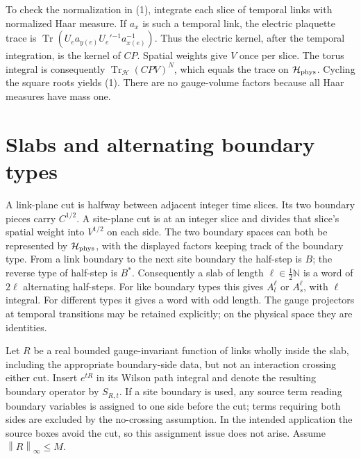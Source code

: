 \documentclass[11pt]{article}
\newcommand{\tr}{\operatorname{Tr}}
\newcommand{\norm}[1]{\left\|#1\right\|}
\begin{document}
To check the normalization in (1), integrate each slice of temporal
links with normalized Haar measure. If $a_x$ is such a temporal link,
the electric plaquette trace is
$\tr(U_e a_{y(e)}U_e'{}^{-1}a_{x(e)}^{-1})$.
Thus the electric kernel, after the temporal integration, is the
kernel of $CP$. Spatial weights give $V$ once per slice. The torus
integral is consequently $\tr_{\mathcal H}(CPV)^N$, which equals
the trace on $\mathcal H_{\rm phys}$. Cycling the square roots yields
(1). There are no gauge-volume factors because all Haar measures have
mass one.

\section{Slabs and alternating boundary types}

A link-plane cut is halfway between adjacent integer time slices.
Its two boundary pieces carry $C^{1/2}$. A site-plane cut is at an
integer slice and divides that slice's spatial weight into $V^{1/2}$
on each side. The two boundary spaces can both be represented by
$\mathcal H_{\rm phys}$, with the displayed factors keeping track of
the boundary type.
From a link boundary to the next site boundary the half-step is $B$;
the reverse type of half-step is $B^*$. Consequently a slab of length
$\ell\in\tfrac12\mathbb N$ is a word of $2\ell$ alternating half-steps.
For like boundary types this gives $A_l^\ell$ or $A_s^\ell$, with
$\ell$ integral. For different types it gives a word with odd length.
The gauge projectors at temporal transitions may be retained explicitly;
on the physical space they are identities.

Let $R$ be a real bounded gauge-invariant function of links wholly
inside the slab, including the appropriate boundary-side data, but not
an interaction crossing either cut. Insert $e^{tR}$ in its Wilson path
integral and denote the resulting boundary operator by $S_{R,t}$.
If a site boundary is used, any source term reading boundary variables
is assigned to one side before the cut; terms requiring both sides
are excluded by the no-crossing assumption. In the intended application
the source boxes avoid the cut, so this assignment issue does not arise.
Assume $\norm R_\infty\leq M$.
\end{document}
